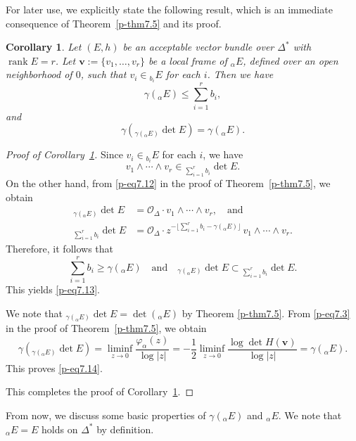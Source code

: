 \documentclass[12pt,twoside]{amsart}
\DeclareMathOperator{\rank}{rank}
\newtheorem{cor}[thm]{Corollary}
\theoremstyle{definition}
\begin{document}
For later use, we explicitly state the following result,  
which is an immediate consequence of Theorem~\ref{p-thm7.5} and its proof.

\begin{cor}\label{p-cor7.7}
Let $(E, h)$ be an acceptable vector bundle over 
$\Delta^*$ with $\rank E = r$.  
Let $\bm v:=\{v_1, \ldots, v_r\}$ be a local frame 
of ${}_\alpha E$, defined over an open neighborhood of $0$, such that  
$v_i \in {}_{b_i} E$ for each $i$.  
Then we have 
\begin{equation}\label{p-eq7.13}
\gamma({}_\alpha E) \leq \sum_{i=1}^r b_i,
\end{equation} 
and 
\begin{equation}\label{p-eq7.14}
\gamma\left({}_{\gamma ({}_\alpha E)} \det E\right) = \gamma ({}_\alpha E).
\end{equation}
\end{cor}

\begin{proof}[Proof of Corollary~\ref{p-cor7.7}]
Since $v_i \in {}_{b_i} E$ for each $i$,  
we have 
\[
v_1 \wedge \cdots \wedge v_r \in {}_{\sum_{i=1}^r b_i} \det E.
\]  
On the other hand, from \eqref{p-eq7.12} in the proof of Theorem~\ref{p-thm7.5}, we obtain
\[
\begin{split}
{}_{\gamma ({}_\alpha E)} \det E &= \mathcal O_\Delta \cdot 
v_1 \wedge \cdots \wedge v_r, \quad \text{and} \\
{}_{\sum_{i=1}^r b_i} \det E &= \mathcal O_\Delta 
\cdot z^{-\lfloor \sum_{i=1}^r b_i - \gamma({}_\alpha E) \rfloor} \, v_1 \wedge \cdots \wedge v_r.
\end{split}
\] 
Therefore, it follows that
\[
\sum_{i=1}^r b_i \geq \gamma ({}_\alpha E)
\quad \text{and} \quad
{}_{\gamma({}_\alpha E)} \det E \subset {}_{\sum_{i=1}^r b_i} \det E.
\]
This yields \eqref{p-eq7.13}.

We note that 
${}_{\gamma ({}_\alpha E)} \det E=\det ({}_\alpha E)$ by Theorem 
\ref{p-thm7.5}. 
From \eqref{p-eq7.3} in the proof of Theorem~\ref{p-thm7.5}, we obtain
\[
\gamma \left({}_{\gamma ({}_\alpha E)} \det E\right) 
= \liminf_{z \to 0} \frac{\varphi_\alpha (z)}{\log |z|}
= -\frac{1}{2} \liminf_{z \to 0} \frac{\log \det H(\bm v)}{\log |z|}
= \gamma ({}_\alpha E).
\]
This proves \eqref{p-eq7.14}.

This completes the proof of Corollary~\ref{p-cor7.7}.
\end{proof}

From now, we discuss some 
basic properties of $\gamma ({}_\alpha E)$ and 
${}_\alpha E$. We note that ${}_\alpha E=E$ holds on $\Delta^*$ by definition. 
\end{document}
